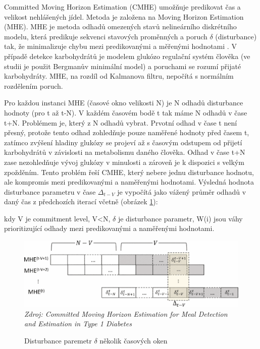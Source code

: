 Committed Moving Horizon Estimation (CMHE) \citep{Analyza.MovingHorizon} umožňuje predikovat čas a velikost nehlášených jídel. Metoda je založena na Moving Horizon Estimation (MHE). MHE je metoda odhadů omezených stavů nelineárního diskrétního modelu, která predikuje sekvenci stavových proměnných a poruch $\delta$ (disturbance) tak, že minimalizuje chybu mezi predikovanými a měřenými hodnotami \citep{Analyza.MovingHorizon}. V případě detekce karbohydrátů je modelem glukózo regulační systém člověka (ve studii je použit Bergmanův minimální model) a poruchami se rozumí přijaté karbohydráty. MHE, na rozdíl od Kalmanova filtru, nepočítá s normálním rozdělením poruch. 

Pro každou instanci MHE (časové okno velikosti N) je N odhadů disturbance hodnoty (pro t až t-N). V každém časovém bodě t tak máme N odhadů v čase t+N. Problémem je, který z N odhadů vybrat. Prvotní odhad v čase t není přesný, protože tento odhad zohledňuje pouze naměřené hodnoty před časem t, zatímco zvýšení hladiny glukózy se projeví až s časovým odstupem od přijetí karbohydrátů v závislosti na metabolismu daného člověka. Odhad v čase t+N zase nezohledňuje vývoj glukózy v minulosti a zároveň je k dispozici s velkým zpožděním. Tento problém řeší CMHE, který nebere jednu disturbance hodnotu, ale kompromis mezi predikovanými a naměřenými hodnotami. Výsledná hodnota disturbance parametru v čase $\Delta_{t-V}$ je vypočítá jako vážený průměr odhadů v daný čas z předchozích iterací včetně (obrázek \ref{fig:horizon1}):


kdy V je commitment level, V<N, $\delta$ je disturbance parametr, W(i) jsou váhy prioritizující odhady mezi predikovanými a naměřenými hodnotami.

\begin{figure}[H]
\caption{Disturbance paremetr $\delta$ několik časových oken}
\label{fig:horizon1}
\centering
\includegraphics[width=1\textwidth]{img/analyza/horizon1.png}\\
\textit{Zdroj: Committed Moving Horizon Estimation for Meal Detection and Estimation in Type 1 Diabetes \citep{Analyza.MovingHorizon}}
\end{figure}

